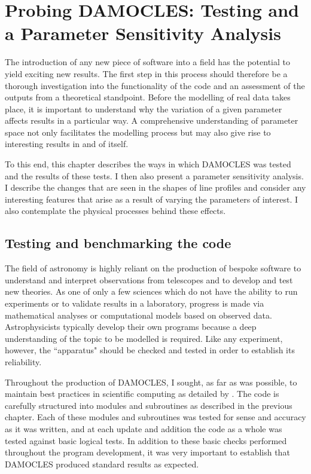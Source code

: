 

%
%
\chapter{Probing DAMOCLES:  Testing and a Parameter Sensitivity Analysis}\label{chp:chp4}

The introduction of any new piece of software into a field has the potential to yield exciting new results.  The first step in this process should therefore be a thorough investigation into the functionality of the code and an assessment of the outputs from a theoretical standpoint.  Before the modelling of real data takes place, it is important to understand why the variation of a  given parameter affects results in a particular way.  A comprehensive understanding of parameter space not only facilitates the modelling process but may also give rise to interesting results in and of itself.

To this end, this chapter describes the ways in which DAMOCLES was tested and the results of these tests.  I then also present a parameter sensitivity analysis.  I describe the changes that are seen in the shapes of line profiles and consider any interesting features that arise as a result of varying the parameters of interest.  I also contemplate the physical processes behind these effects.


\section{Testing and benchmarking the code}

The field of astronomy is highly reliant on the production of bespoke software to understand and interpret observations from telescopes and to develop and test new theories.  As one of only a few sciences which do not have the ability to run experiments or to validate results in a laboratory, progress is made via mathematical analyses or computational models based on observed data.  Astrophysicists typically develop their own programs because a deep understanding of the topic to be modelled is required.  Like any experiment, however, the ``apparatus" should be checked and tested in order to establish its reliability.

Throughout the production of DAMOCLES, I sought, as far as was possible, to maintain best practices in scientific computing as detailed by \citet{Wilson2012}.  The code is carefully structured into modules and subroutines as described in the previous chapter.  Each of these modules and subroutines was tested for sense and accuracy as it was written, and at each update and addition the code as a whole was tested against basic logical tests.  In addition to these basic checks performed throughout the program development, it was very important to establish that DAMOCLES produced standard results as expected.

